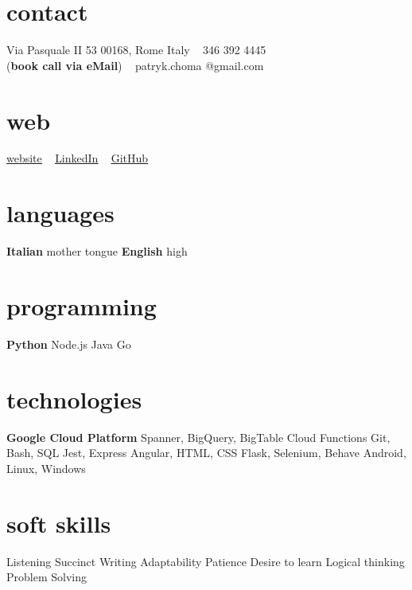 \documentclass[]{cv-style}          %
\begin{document}
\lastupdated


\begin{aside}
%
\section{contact}
Via Pasquale II 53
00168, Rome
Italy
~
{\Telefon} 346 392 4445 \\(\textbf{book call via eMail})
~
{\Email} patryk.choma
@gmail.com
%
\section{web}
 \href{https://ch-pat.github.io/}{\underline{website}}
~
 \href{https://www.linkedin.com/in/p-choma/}{\underline{LinkedIn}}
~
 \href{https://github.com/ch-pat}{\underline{GitHub}}
%
\section{languages}
\textbf{Italian} mother tongue
\textbf{English} high
%
\section{programming}
\textbf{Python}
Node.js
Java
Go
%
\section{technologies}
\textbf{Google Cloud Platform}
Spanner, BigQuery, BigTable
Cloud Functions
Git, Bash, SQL
Jest, Express
Angular, HTML, CSS
Flask, Selenium, Behave
Android, Linux, Windows
%
\section{soft skills}
Listening 
Succinct Writing
Adaptability
Patience
Desire to learn
Logical thinking
Problem Solving
\end{aside}

\end{document}
